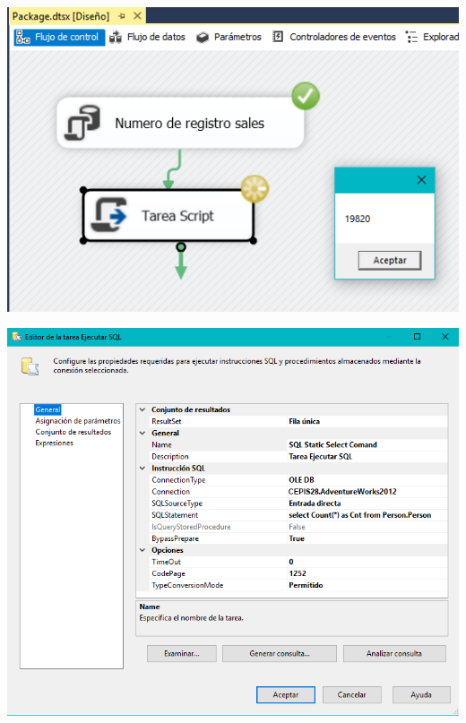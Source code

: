 \begin{itemize}
	\begin{center}
	\includegraphics[width=14cm]{./Imagenes/tarea2_10}
	\end{center}
\begin{center}
	\includegraphics[width=14cm]{./Imagenes/tarea2_11}
	\end{center}


\end{itemize}
